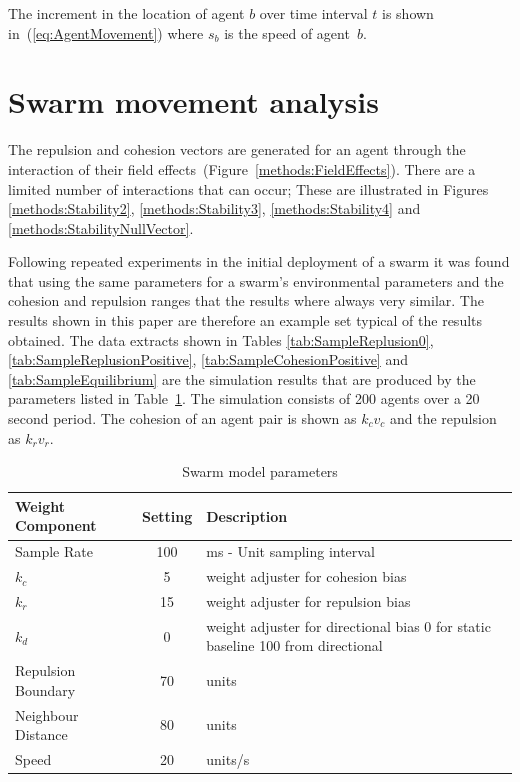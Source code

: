\documentclass{ieeeaccess}
\begin{document}
The increment in the location of agent $b$ over time interval $t$ is shown in~(\ref{eq:AgentMovement}) where $s_b$ is the speed of agent~$b$.

\section{Swarm movement analysis\label{metric:MagnitudeDynamics2}}
The repulsion and cohesion vectors are generated for an agent through the interaction of their field effects~(Figure~\ref{methods:FieldEffects}). There are a limited number of interactions that can occur; These are illustrated in Figures \ref{methods:Stability2}, \ref{methods:Stability3}, \ref{methods:Stability4} and \ref{methods:StabilityNullVector}.

Following repeated experiments in the initial deployment of a swarm it was found that using the same parameters for a swarm's environmental parameters and the cohesion and repulsion ranges that the results where always very similar. The results shown in this paper are therefore an example set typical of the results obtained. The data extracts shown in Tables \ref{tab:SampleReplusion0}, \ref{tab:SampleReplusionPositive}, \ref{tab:SampleCohesionPositive} and  \ref{tab:SampleEquilibrium} are the simulation results that are produced by the parameters listed in Table~\ref{tab:MetricPhysics1}. The simulation consists of 200 agents over a 20 second period. The cohesion of an agent pair is shown as $k_cv_c$ and the repulsion as $k_rv_r$.

\begin{table}[H]
\begin{center}
\begin{tabular}{| p{2.5cm} | c | p{3cm} |}
\hline
\bf Weight \bf Component & \bf Setting & \bf Description \\ \hline
Sample Rate & 100 & ms - Unit sampling interval\\  \hline
$k_c$ & 5 & weight adjuster for cohesion bias\\  \hline
$k_r$ & 15 & weight adjuster for repulsion  bias\\  \hline
$k_d$ & 0 & weight adjuster for directional bias 0 for static baseline 100 from directional\\  \hline
Repulsion Boundary & 70 & units\\  \hline
Neighbour Distance & 80 & units\\  \hline
Speed & 20 & units/s\\  \hline
\end{tabular}\caption{Swarm model parameters} \label{tab:MetricPhysics1}
\end{center}
\end{table}
\end{document}
